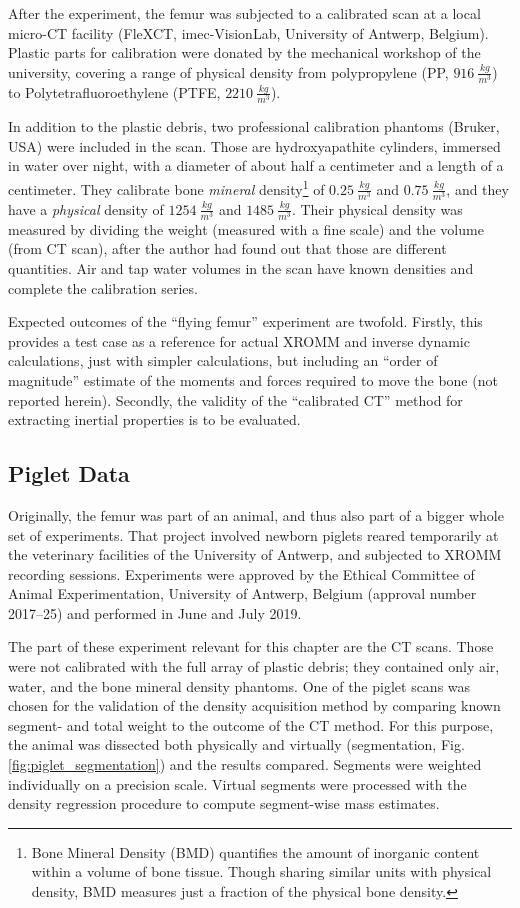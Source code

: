 After the experiment, the femur was subjected to a calibrated scan at a local micro-CT facility (FleXCT, imec-VisionLab, University of Antwerp, Belgium).
Plastic parts for calibration were donated by the mechanical workshop of the university, covering a range of physical density from polypropylene (PP, \(916\ \frac{kg}{m^3}\)) to Polytetrafluoroethylene (PTFE, \(2210\ \frac{kg}{m^3}\)).

In addition to the plastic debris, two professional calibration phantoms (Bruker, USA) were included in the scan.
Those are hydroxyapathite cylinders, immersed in water over night, with a diameter of about half a centimeter and a length of a centimeter.
They calibrate bone \emph{mineral} density\footnote{Bone Mineral Density (BMD) quantifies the amount of inorganic content within a volume of bone tissue. Though sharing similar units with physical density, BMD measures just a fraction of the physical bone density.} of \(0.25\ \frac{kg}{m^3}\) and \(0.75\ \frac{kg}{m^3}\), and they have a \emph{physical} density of \(1254\ \frac{kg}{m^3}\) and \(1485\ \frac{kg}{m^3}\).
Their physical density was measured by dividing the weight (measured with a fine scale) and the volume (from CT scan), after the author had found out that those are different quantities.
Air and tap water volumes in the scan have known densities and complete the calibration series.


Expected outcomes of the ``flying femur'' experiment are twofold.
Firstly, this provides a test case as a reference for actual XROMM and inverse dynamic calculations, just with simpler calculations, but including an ``order of magnitude'' estimate of the moments and forces required to move the bone (not reported herein).
Secondly, the validity of the ``calibrated CT'' method for extracting inertial properties is to be evaluated.
\subsection{Piglet Data}
\label{sec:orgfd97476}
Originally, the femur was part of an animal, and thus also part of a bigger whole set of experiments.
That project involved newborn piglets reared temporarily at the veterinary facilities of the University of Antwerp, and subjected to XROMM recording sessions.
Experiments were approved by the Ethical Committee of Animal Experimentation, University of Antwerp, Belgium (approval number 2017–25) and performed in June and July 2019.

The part of these experiment relevant for this chapter are the CT scans.
Those were not calibrated with the full array of plastic debris; they contained only air, water, and the bone mineral density phantoms.
One of the piglet scans was chosen for the validation of the density acquisition method by comparing known segment- and total weight to the outcome of the CT method.
For this purpose, the animal was dissected both physically and virtually (segmentation, Fig. \ref{fig:piglet_segmentation}) and the results compared.
Segments were weighted individually on a precision scale.
Virtual segments were processed with the density regression procedure to compute segment-wise mass estimates.

